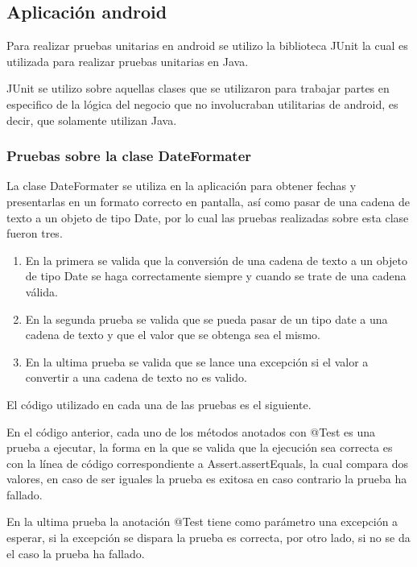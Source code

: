 \subsection{Aplicación android}

Para realizar pruebas unitarias en android se utilizo la biblioteca JUnit la cual es utilizada para realizar pruebas unitarias en Java.

JUnit se utilizo sobre aquellas clases que se utilizaron para trabajar partes en especifico de la lógica del negocio que no involucraban utilitarias de android, es decir, que solamente utilizan Java.

\subsubsection{Pruebas sobre la clase DateFormater}

La clase DateFormater se utiliza en la aplicación para obtener fechas y presentarlas en un formato correcto en pantalla, así como pasar de una cadena de texto a un objeto de tipo Date, por lo cual las pruebas realizadas sobre esta clase fueron tres.

\begin{enumerate}
	\item En la primera se valida que la conversión de una cadena de texto a un objeto de tipo Date se haga correctamente siempre y cuando se trate de una cadena válida.
	\item En la segunda prueba se valida que se pueda pasar de un tipo date a una cadena de texto y que el valor que se obtenga sea el mismo.
	\item En la ultima prueba se valida que se lance una excepción si el valor a convertir a una cadena de texto no es valido.
\end{enumerate}

El código utilizado en cada una de las pruebas es el siguiente.



En el código anterior, cada uno de los métodos anotados con @Test es una prueba a ejecutar, la forma en la que se valida que la ejecución sea correcta es con la línea de código correspondiente a Assert.assertEquals, la cual compara dos valores, en caso de ser iguales la prueba es exitosa en caso contrario la prueba ha fallado.

En la ultima prueba la anotación @Test tiene como parámetro una excepción a esperar, si la excepción se dispara la prueba es correcta, por otro lado,  si no se da el caso la prueba ha fallado.

